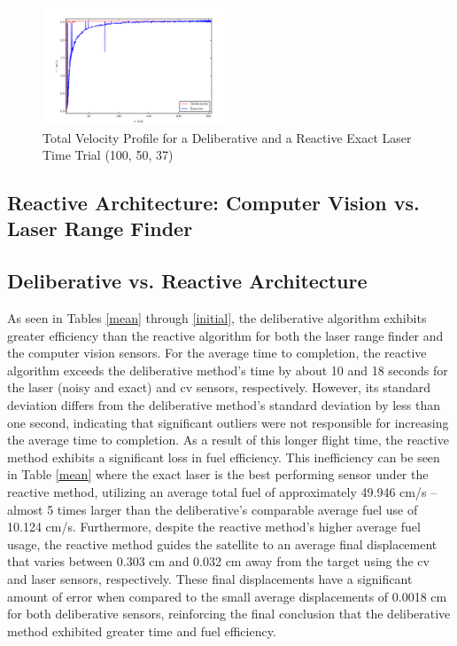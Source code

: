 \documentclass[journal, 10pt]{IEEEtran}
\begin{document}
\begin{figure}[tb]
\begin{center}
\includegraphics[width=0.5\textwidth]{figures/TotalVelocityNoisy.pdf}
\caption{Total Velocity Profile for a Deliberative and a Reactive Exact Laser Time Trial (100, 50, 37)}
\label{noisy_total}
\end{center}
\end{figure}
\subsection{Reactive Architecture: Computer Vision vs. Laser Range Finder}

\subsection{Deliberative vs. Reactive Architecture}

As seen in Tables \ref{mean} through \ref{initial}, the deliberative algorithm exhibits greater efficiency than the reactive algorithm for both the laser range finder and the computer vision sensors. For the average time to completion, the reactive algorithm exceeds the deliberative method's time by about 10 and 18 seconds for the laser (noisy and exact) and cv sensors, respectively. However, its standard deviation differs from the deliberative method's standard deviation by less than one second, indicating that significant outliers were not responsible for increasing the average time to completion. As a result of this longer flight time, the reactive method exhibits a significant loss in fuel efficiency. This inefficiency can be seen in Table \ref{mean} where the exact laser is the best performing sensor under the reactive method, utilizing an average total fuel of approximately 49.946 cm/s -- almost 5 times larger than the deliberative's comparable average fuel use of 10.124 cm/s. Furthermore, despite the reactive method's higher average fuel usage, the reactive method guides the satellite to an average final displacement that varies between 0.303 cm and 0.032 cm away from the target using the cv and laser sensors, respectively. These final displacements have a significant amount of error when compared to the small average displacements of 0.0018 cm for both deliberative sensors, reinforcing the final conclusion that the deliberative method exhibited greater time and fuel efficiency.
\end{document}
